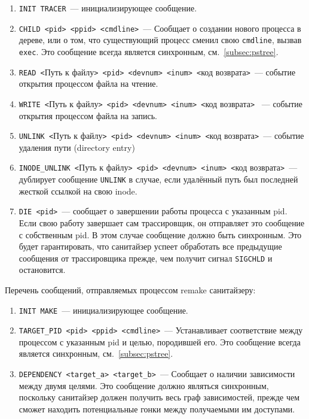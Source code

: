 \begin{enumerate}
    \item \texttt{INIT TRACER}~--- инициализирующее сообщение.
    \item \texttt{CHILD <pid> <ppid> <cmdline>}~--- Сообщает о создании нового процесса в дереве, или о том, что существующий процесс сменил свою \texttt{cmdline}, вызвав \texttt{exec}. Это сообщение всегда является синхронным, см.~\ref{subsec:pstree}.
    \item \texttt{READ <}Путь к файлу\texttt{> <pid> <devnum> <inum> <}код возврата\texttt{>}~--- событие открытия процессом файла на чтение.
    \item \texttt{WRITE <}Путь к файлу\texttt{> <pid> <devnum> <inum> <}код возврата\texttt{>}
    ~--- событие открытия процессом файла на запись.
    \item \texttt{UNLINK <}Путь к файлу\texttt{> <pid> <devnum> <inum> <}код возврата\texttt{>}~--- событие удаления пути (directory entry)
    \item \texttt{INODE\_UNLINK <}Путь к файлу\texttt{> <pid> <devnum> <inum> <}код возврата\texttt{>}~--- дублирует сообщение \texttt{UNLINK} в случае, если удалённый путь был последней жесткой ссылкой на свою inode.
    \item \texttt{DIE <pid>}~--- сообщает о завершении работы процесса с указанным pid. Если свою работу завершает сам трассировщик, он отправляет это сообщение с собственным pid. В этом случае сообщение должно быть синхронным. Это будет гарантировать, что санитайзер успеет обработать все предыдущие сообщения от трассировщика прежде, чем получит сигнал \texttt{SIGCHLD} и остановится.
\end{enumerate}

Перечень сообщений, отправляемых процессом remake санитайзеру:

\begin{enumerate}
    \item \texttt{INIT MAKE}~--- инициализирующее сообщение.
    \item \texttt{TARGET\_PID <pid> <ppid> <cmdline>}~--- Устанавливает соответствие между процессом с указанным pid и целью, породившей его. Это сообщение всегда является синхронным, см.~\ref{subsec:pstree}.
    \item \texttt{DEPENDENCY <target\_a> <target\_b>}~--- Сообщает о наличии зависимости между двумя целями. Это сообщение должно являться синхронным, поскольку санитайзер должен получить весь граф зависимостей, прежде чем сможет находить потенциальные гонки между получаемыми им доступами.
\end{enumerate}

